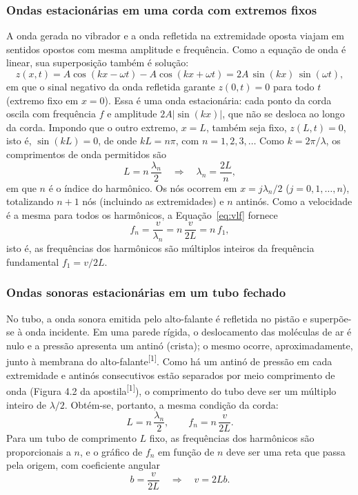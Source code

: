 \documentclass[12pt, a4paper]{article}
\newcommand{\cita}[1]{\textsuperscript{[#1]}}
\begin{document}
\subsubsection{Ondas estacionárias em uma corda com extremos fixos}
\label{sec:corda}

A onda gerada no vibrador e a onda refletida na extremidade oposta viajam em sentidos opostos com mesma amplitude e frequência. Como a equação de onda é linear, sua superposição também é solução:
\[
z(x,t)=A\cos(kx-\omega t)-A\cos(kx+\omega t)=2A\,\sin(kx)\,\sin(\omega t),
\]
em que o sinal negativo da onda refletida garante $z(0,t)=0$ para todo $t$ (extremo fixo em $x=0$). Essa é uma onda estacionária: cada ponto da corda oscila com frequência $f$ e amplitude $2A|\sin(kx)|$, que não se desloca ao longo da corda. Impondo que o outro extremo, $x=L$, também seja fixo, $z(L,t)=0$, isto é, $\sin(kL)=0$, de onde $kL=n\pi$, com $n=1,2,3,\dots$ Como $k=2\pi/\lambda$, os comprimentos de onda permitidos são
\begin{equation}
L=n\,\frac{\lambda_n}{2}
\quad\Longrightarrow\quad
\lambda_n=\frac{2L}{n},
\label{eq:ln}
\end{equation}
em que $n$ é o índice do harmônico. Os nós ocorrem em $x=j\lambda_n/2$ ($j=0,1,\dots,n$), totalizando $n+1$ nós (incluindo as extremidades) e $n$ antinós. Como a velocidade é a mesma para todos os harmônicos, a Equação~\eqref{eq:vlf} fornece
\begin{equation}
f_n=\frac{v}{\lambda_n}=n\,\frac{v}{2L}=n\,f_1,
\label{eq:fn}
\end{equation}
isto é, as frequências dos harmônicos são múltiplos inteiros da frequência fundamental $f_1=v/2L$.

\subsubsection{Ondas sonoras estacionárias em um tubo fechado}

No tubo, a onda sonora emitida pelo alto-falante é refletida no pistão e superpõe-se à onda incidente. Em uma parede rígida, o deslocamento das moléculas de ar é nulo e a pressão apresenta um antinó (crista); o mesmo ocorre, aproximadamente, junto à membrana do alto-falante\cita{1}. Como há um antinó de pressão em cada extremidade e antinós consecutivos estão separados por meio comprimento de onda (Figura 4.2 da apostila\cita{1}), o comprimento do tubo deve ser um múltiplo inteiro de $\lambda/2$. Obtém-se, portanto, a mesma condição da corda:
\begin{equation}
L=n\,\frac{\lambda_n}{2},
\qquad
f_n=n\,\frac{v}{2L}.
\label{eq:fsom}
\end{equation}
Para um tubo de comprimento $L$ fixo, as frequências dos harmônicos são proporcionais a $n$, e o gráfico de $f_n$ em função de $n$ deve ser uma reta que passa pela origem, com coeficiente angular
\begin{equation}
b=\frac{v}{2L}
\quad\Longrightarrow\quad
v=2Lb.
\label{eq:v2Lb}
\end{equation}
\end{document}
